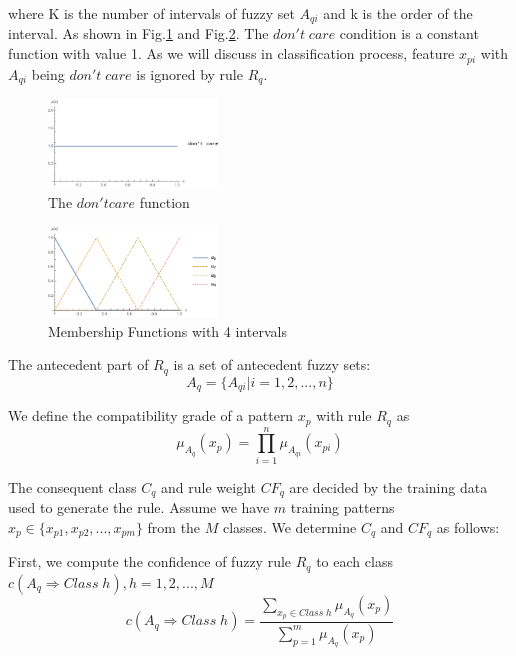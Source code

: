 \documentclass[conference]{IEEEtran}
\begin{document}
  where K is the number of intervals of fuzzy set $A_{qi}$ and k is the order of the interval. As shown in Fig.\ref{u0} and Fig.\ref{u3}. The $don't\;care$ condition is a constant function with value 1. As we will discuss in classification process, feature $x_{pi} $ with $A_{qi}$ being $don't\;care$ is ignored by rule $R_q$. 

  \begin{figure}[H]
 	\centering
 	\includegraphics[width=0.4\textwidth]{figures/u1.png}
   \caption{The $don't care$ function}\label{fig:digit}
   \label{u0}
 \end{figure}
 \begin{figure}[H]
 	\centering
 	\includegraphics[width=0.4\textwidth]{figures/u4.png}
   \caption{Membership Functions with 4 intervals}\label{fig:digit}
   \label{u3}
 \end{figure}
  The antecedent part of $R_q$ is a set of antecedent fuzzy sets:
\begin{equation}A_q = \{A_{qi}|i = 1,2,...,n\}\end{equation}

  We define the compatibility grade of a pattern $x_p$ with rule $R_q$ as
  \begin{equation}\mu_{A_q}(x_p) = \prod_{i = 1}^{n}\mu_{A_{qi}}(x_{pi})\end{equation}

  The consequent class $C_q$ and rule weight $CF_q$ are decided by the training data used to generate the rule. 
  Assume we have $m$ training patterns $x_{p} \in \{x_{p1},x_{p2},...,x_{pm}\}$ from the $M$ classes. We determine $C_q$ and $CF_q$ as follows:

  First, we compute the confidence of fuzzy rule $R_q$ to each class $c(A_q \Rightarrow Class\;h), h = 1,2,...,M$
\begin{equation}
c(A_q \Rightarrow Class\; h) = \frac{\sum\limits_{x_p \in Class\;h}\mu_{A_q}(x_p)}{\sum\limits_{p=1}^m\mu_{A_q}(x_p)}
\end{equation}
\end{document}
